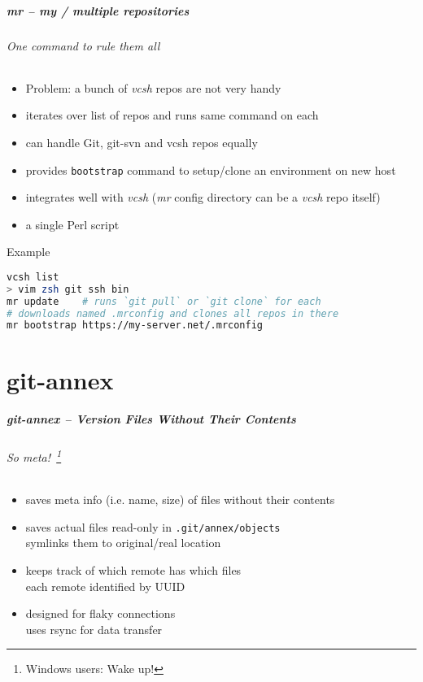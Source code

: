 \documentclass[english,hyperref={pdfpagelabels=false},aspectratio=169]{beamer}
\begin{document}
\begin{frame}[label=mr,fragile]
  \frametitle{mr -- my / multiple repositories}
  \framesubtitle{One command to rule them all}
  \begin{itemize}
    \item Problem: a bunch of \textit{vcsh} repos are not very handy
    \item iterates over list of repos and runs same command on each
    \item can handle Git, git-svn and vcsh repos equally
    \item provides \texttt{bootstrap} command to setup/clone an environment on new host
    \item integrates well with \textit{vcsh} {\scriptsize\color{fzjgray50}(\textit{mr} config directory can be a \textit{vcsh} repo itself)}
    \item a single Perl script
  \end{itemize}
  \begin{block}{Example}
    \vspace{-0.75em}
    \begin{lstlisting}[language=zsh]
vcsh list
> vim zsh git ssh bin
mr update    # runs `git pull` or `git clone` for each
# downloads named .mrconfig and clones all repos in there
mr bootstrap https://my-server.net/.mrconfig
    \end{lstlisting}
    \vspace{-0.75em}
  \end{block}
\end{frame}


\part{git-annex}
\makepart

\begin{frame}[label=gitannex]
  \frametitle{git-annex -- Version Files Without Their Contents}
  \framesubtitle{So meta!~\footnote{\tiny Windows users: Wake up!}}
  \begin{itemize}
    \item saves meta info {\scriptsize\color{fzjgray50}(i.e. name, size)} of files without their contents
    \item saves actual files read-only in \texttt{.git/annex/objects}\\
      {\scriptsize symlinks them to original/real location}
    \item keeps track of which remote has which files\\
      {\scriptsize each remote identified by UUID}
    \item designed for flaky connections\\
      {\scriptsize uses rsync for data transfer}
  \end{itemize}
\end{frame}
\end{document}
